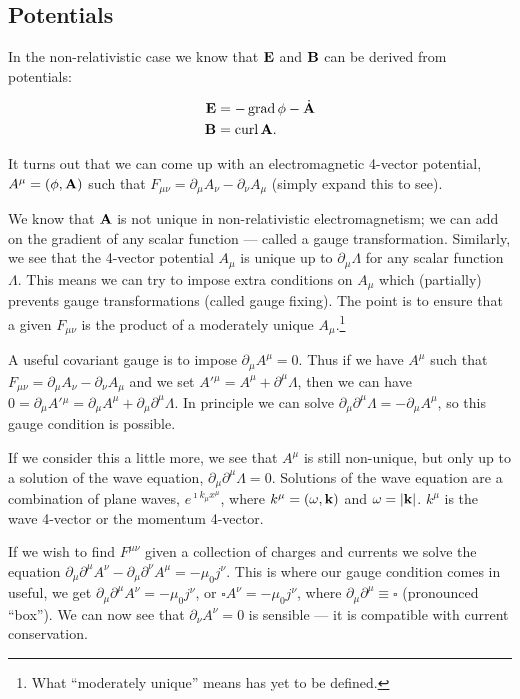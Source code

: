 \documentclass{notes}
\newcommand{\B}{\vect{B}}
\newcommand{\E}{\vect{E}}
\renewcommand{\Box}{\square}
\DeclareMathOperator{\curl}{curl}
\DeclareMathOperator{\grad}{grad}
\begin{document}
\subsection{Potentials}

In the non-relativistic case we know that $\E$ and $\B$ can be derived
from potentials:

\begin{align*}
\E &= -\grad \phi - \dot{\vect{A}} \\
\B &= \curl \vect{A}.
\end{align*}

It turns out that we can come up with an electromagnetic 4-vector potential,
$A^\mu = (\phi, \mathbf{A})$ such that $F_{\mu \nu} = \partial_\mu A_\nu -
\partial_\nu A_\mu$ (simply expand this to see).

We know that $\mathbf{A}$ is not unique in non-relativistic electromagnetism;
we can add on the gradient of any scalar function --- called a gauge
transformation.  Similarly, we see that the 4-vector potential $A_\mu$ is
unique up to $\partial_\mu \Lambda$ for any scalar function $\Lambda$.  This
means we can try to impose extra conditions on $A_\mu$ which (partially)
prevents gauge transformations (called gauge fixing).  The point is to ensure
that a given $F_{\mu \nu}$ is the product of a moderately unique
$A_\mu$.\footnote{What ``moderately unique'' means has yet to be defined.}

A useful covariant gauge is to impose $\partial_\mu A^\mu = 0$.  Thus
if we have $A^\mu$ such that $F_{\mu \nu} = \partial_\mu A_\nu
- \partial_\nu A_\mu$ and we set $A'{}^\mu = A^\mu + \partial^\mu \Lambda$,
then we can have $0 = \partial_\mu A'{}^\mu = \partial_\mu A^\mu
+ \partial_\mu \partial^\mu \Lambda$.  In principle we can solve
$\partial_\mu \partial^\mu \Lambda = - \partial_\mu A^\mu$, so this
gauge condition is possible.

If we consider this a little more, we see that $A^\mu$ is still non-unique,
but only up to a solution of the wave equation, $\partial_\mu \partial^\mu
\Lambda = 0$.  Solutions of the wave equation are a combination of
plane waves, $e^{\imath k_\mu x^\mu}$, where $k^\mu = (\omega,\mathbf{k})$
and $\omega = \left|\mathbf{k}\right|$.  $k^\mu$ is the wave 4-vector or the momentum
4-vector.

If we wish to find $F^{\mu \nu}$ given a collection of charges and
currents we solve the equation $\partial_\mu \partial^\mu A^\nu -
\partial_\mu \partial^\nu A^\mu = - \mu_0 j^\nu$.  This is where our
gauge condition comes in useful, we get $\partial_\mu \partial^\mu
A^\nu = - \mu_0 j^\nu$, or $\Box A^\nu = - \mu_0 j^\nu$, where
$\partial_\mu \partial^\mu \equiv \Box$ (pronounced ``box'').  We can
now see that $\partial_\nu A^\nu = 0$ is sensible --- it is compatible
with current conservation.
\end{document}
